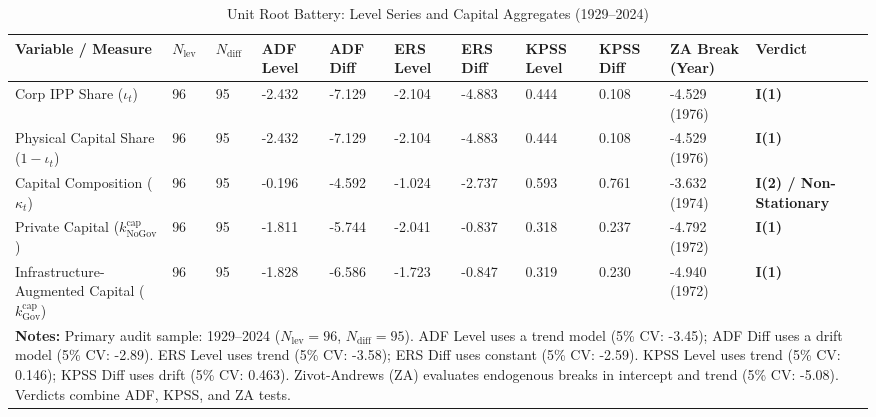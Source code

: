 \begin{table}[H]
\centering
\scriptsize
\caption{Unit Root Battery: Level Series and Capital Aggregates (1929--2024)}
\label{tab:urca_levels}
\begin{tabular}{p{5.5cm} p{0.5cm} p{0.5cm} p{1.3cm} p{1.3cm} p{1.3cm} p{1.3cm} p{1.3cm} p{1.3cm} p{2.2cm} p{2.2cm}}
\toprule
\textbf{Variable / Measure} & \textbf{$N_{\text{lev}}$} & \textbf{$N_{\text{diff}}$} & \textbf{ADF Level} & \textbf{ADF Diff} & \textbf{ERS Level} & \textbf{ERS Diff} & \textbf{KPSS Level} & \textbf{KPSS Diff} & \textbf{ZA Break (Year)} & \textbf{Verdict} \\
\midrule
Corp IPP Share ($\iota_t$) & 96 & 95 & -2.432 & -7.129 & -2.104 & -4.883 & 0.444 & 0.108 & -4.529 (1976) & \textbf{I(1)} \\ 
Physical Capital Share ($1 - \iota_t$) & 96 & 95 & -2.432 & -7.129 & -2.104 & -4.883 & 0.444 & 0.108 & -4.529 (1976) & \textbf{I(1)} \\ 
Capital Composition ($\kappa_t$) & 96 & 95 & -0.196 & -4.592 & -1.024 & -2.737 & 0.593 & 0.761 & -3.632 (1974) & \textbf{I(2) / Non-Stationary} \\ 
Private Capital ($k^{\text{cap}}_{\text{NoGov}}$) & 96 & 95 & -1.811 & -5.744 & -2.041 & -0.837 & 0.318 & 0.237 & -4.792 (1972) & \textbf{I(1)} \\ 
Infrastructure-Augmented Capital ($k^{\text{cap}}_{\text{Gov}}$) & 96 & 95 & -1.828 & -6.586 & -1.723 & -0.847 & 0.319 & 0.230 & -4.940 (1972) & \textbf{I(1)} \\ 
\bottomrule
\multicolumn{11}{p{21.5cm}}{\footnotesize \textbf{Notes:} Primary audit sample: 1929--2024 ($N_{\text{lev}}=96$, $N_{\text{diff}}=95$). ADF Level uses a trend model (5\% CV: -3.45); ADF Diff uses a drift model (5\% CV: -2.89). ERS Level uses trend (5\% CV: -3.58); ERS Diff uses constant (5\% CV: -2.59). KPSS Level uses trend (5\% CV: 0.146); KPSS Diff uses drift (5\% CV: 0.463). Zivot-Andrews (ZA) evaluates endogenous breaks in intercept and trend (5\% CV: -5.08). Verdicts combine ADF, KPSS, and ZA tests.}
\end{tabular}
\end{table}
